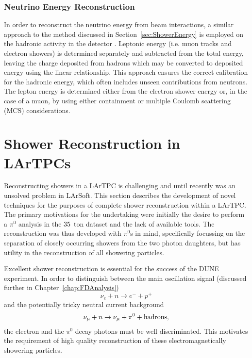 \subsubsection{Neutrino Energy Reconstruction}\label{sec:NeutrinoEnergy}

In order to reconstruct the neutrino energy from beam interactions, a similar approach to the method discussed in Section~\ref{sec:ShowerEnergy} is employed on the hadronic activity in the detector \cite{Grant2017}.  Leptonic energy (i.e. muon tracks and electron showers) is determined separately and subtracted from the total energy, leaving the charge deposited from hadrons which may be converted to deposited energy using the linear relationship.  This approach ensures the correct calibration for the hadronic energy, which often includes unseen contributions from neutrons.  The lepton energy is determined either from the electron shower energy or, in the case of a muon, by using either containment or multiple Coulomb scattering (MCS) considerations.

\section{Shower Reconstruction in LArTPCs}\label{sec:ShowerReconstruction}

Reconstructing showers in a LArTPC is challenging and until recently was an unsolved problem in LArSoft.  This section describes the development of novel techniques for the purposes of complete shower reconstruction within a LArTPC.  The primary motivations for the undertaking were initially the desire to perform a $\pi^0$ analysis in the 35~ton dataset and the lack of available tools.  The reconstruction was thus developed with $\pi^0$s in mind, specifically focussing on the separation of closely occurring showers from the two photon daughters, but has utility in the reconstruction of all showering particles.

Excellent shower reconstruction is essential for the success of the DUNE experiment.  In order to distinguish between the main oscillation signal (discussed further in Chapter~\ref{chap:FDAnalysis})
\begin{equation}
  \nu_e + n \rightarrow e^- + p^+
\end{equation}
and the potentially tricky neutral current background
\begin{equation}
  \nu_{\mu} + n \rightarrow \nu_{\mu} + \pi^0 + \textnormal{hadrons},
\end{equation}
the electron and the $\pi^0$ decay photons must be well discriminated.  This motivates the requirement of high quality reconstruction of these electromagnetically showering particles.

